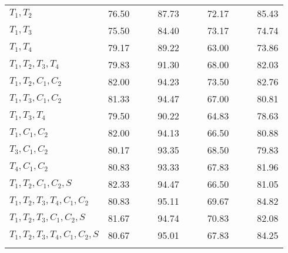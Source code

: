 \begin{table}[t]
{\begin{center}
\begin{tabularx}{0.73\textwidth}{@{}l	lllr	 ll	lllr	 @{}}
$T_1,T_2$ 					& 76.50	& & & 87.73	& & & 72.17 & & & 85.43\\
$T_1,T_3$					& 75.50	& & & 84.40	& & & 73.17	& & & 74.74\\
$T_1,T_4$					& 79.17	& & & 89.22	& & & 63.00	& & & 73.86\\
$T_1,T_2,T_3,T_4$			& 79.83	& & & 91.30	& & & 68.00	& & & 82.03\\
$T_1,T_2,C_1,C_2$			& \cellcolor[gray]{0.8}82.00	& \cellcolor[gray]{0.8}& \cellcolor[gray]{0.8}& \cellcolor[gray]{0.8}94.23	& & & 73.50	& & & 82.76\\
$T_1,T_3,C_1,C_2$			& \cellcolor[gray]{0.8}81.33	&\cellcolor[gray]{0.8} &\cellcolor[gray]{0.8} & \cellcolor[gray]{0.8}94.47	& & & 67.00	& & & 80.81\\
$T_1,T_3,T_4$				& 79.50	& & & 90.22	& & & 64.83	& & & 78.63\\
$T_1,C_1,C_2$				& \cellcolor[gray]{0.8}82.00 &\cellcolor[gray]{0.8} & \cellcolor[gray]{0.8}& \cellcolor[gray]{0.8}94.13 & & & 66.50	& & & 80.88\\
$T_3,C_1,C_2$				& 80.17	& & & 93.35	& & & 68.50	& & & 79.83\\
$T_4,C_1,C_2$				& 80.83	& & & 93.33	& & & 67.83	& & & 81.96\\
$T_1,T_2,C_1,C_2,S$			& \cellcolor[gray]{0.8}82.33 &\cellcolor[gray]{0.8} &\cellcolor[gray]{0.8} & \cellcolor[gray]{0.8}94.47	& & & 66.50	& & & 81.05\\
$T_1,T_2,T_3,T_4,C_1,C_2$	& \cellcolor[gray]{0.8}80.83	&\cellcolor[gray]{0.8} &\cellcolor[gray]{0.8} & \cellcolor[gray]{0.8}95.11	& & & 69.67	& & & 84.82\\
$T_1,T_2,T_3,C_1,C_2,S$		& \cellcolor[gray]{0.8}81.67	&\cellcolor[gray]{0.8} & \cellcolor[gray]{0.8}& \cellcolor[gray]{0.8}94.74	& & & 70.83	& & & 82.08\\
$T_1,T_2,T_3,T_4,C_1,C_2,S$  & 80.67	& & & 95.01	& & & 67.83	& & & 84.25\\	
 	\multicolumn{11}{l}{}\\
 	\bottomrule
  \end{tabularx}  
  \end{center}
	}
	
\end{table}
	



	




	


























	
















